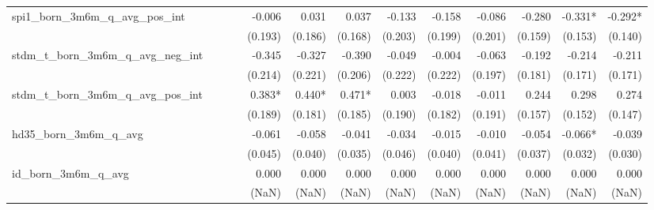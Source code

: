 \begin{tabular}{lrrrrrrrrrrrr}
spi1\_born\_3m6m\_q\_avg\_pos\_int          &              &              &              &       -0.006 &        0.031 &        0.037 &       -0.133 &       -0.158 &       -0.086 &       -0.280 &      -0.331* &      -0.292* \\ 
                                            &              &              &              &      (0.193) &      (0.186) &      (0.168) &      (0.203) &      (0.199) &      (0.201) &      (0.159) &      (0.153) &      (0.140) \\ 
stdm\_t\_born\_3m6m\_q\_avg\_neg\_int       &              &              &              &       -0.345 &       -0.327 &       -0.390 &       -0.049 &       -0.004 &       -0.063 &       -0.192 &       -0.214 &       -0.211 \\ 
                                            &              &              &              &      (0.214) &      (0.221) &      (0.206) &      (0.222) &      (0.222) &      (0.197) &      (0.181) &      (0.171) &      (0.171) \\ 
stdm\_t\_born\_3m6m\_q\_avg\_pos\_int       &              &              &              &       0.383* &       0.440* &       0.471* &        0.003 &       -0.018 &       -0.011 &        0.244 &        0.298 &        0.274 \\ 
                                            &              &              &              &      (0.189) &      (0.181) &      (0.185) &      (0.190) &      (0.182) &      (0.191) &      (0.157) &      (0.152) &      (0.147) \\ 
hd35\_born\_3m6m\_q\_avg                    &              &              &              &       -0.061 &       -0.058 &       -0.041 &       -0.034 &       -0.015 &       -0.010 &       -0.054 &      -0.066* &       -0.039 \\ 
                                            &              &              &              &      (0.045) &      (0.040) &      (0.035) &      (0.046) &      (0.040) &      (0.041) &      (0.037) &      (0.032) &      (0.030) \\ 
id\_born\_3m6m\_q\_avg                      &              &              &              &        0.000 &        0.000 &        0.000 &        0.000 &        0.000 &        0.000 &        0.000 &        0.000 &        0.000 \\ 
                                            &              &              &              &        (NaN) &        (NaN) &        (NaN) &        (NaN) &        (NaN) &        (NaN) &        (NaN) &        (NaN) &        (NaN) \\ 

\end{tabular}
